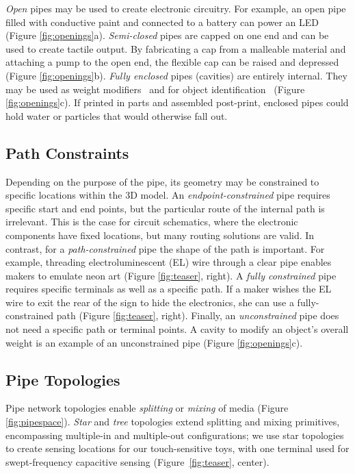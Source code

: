 \emph{Open} pipes may be used to create electronic circuitry.  For example, an open pipe filled with conductive paint and connected to a battery can power an LED (Figure \ref{fig:openings}a).
%
\emph{Semi-closed} pipes are capped on one end and can be used to create tactile output. By fabricating a cap from a malleable material and attaching a pump to the open end, the flexible cap can be raised and depressed (Figure \ref{fig:openings}b).
%
\emph{Fully enclosed} pipes (cavities) are entirely internal.  They may be used as weight modifiers~\cite{Prevost-makeitstand} and for object identification~\cite{Willis-infrastructs} (Figure \ref{fig:openings}c).  If printed in parts and assembled post-print, enclosed pipes could hold water or particles that would otherwise fall out.

\subsection{Path Constraints}
Depending on the purpose of the pipe, its geometry may be constrained to specific locations within the 3D model. An \emph{endpoint-constrained} pipe requires specific start and end points, but the particular route of the internal path is irrelevant. This is the case for circuit schematics, where the electronic components have fixed locations, but many routing solutions are valid. In contrast, for a \emph{path-constrained} pipe the shape of the path is important. For example, threading electroluminescent (EL) wire through a clear pipe enables makers to emulate neon art (Figure \ref{fig:teaser}, right). A \emph{fully constrained} pipe requires specific terminals as well as a specific path. If a maker wishes the EL wire to exit the rear of the sign to hide the electronics, she can use a fully-constrained path (Figure \ref{fig:teaser}, right). Finally, an \emph{unconstrained} pipe does not need a specific path or terminal points. A cavity to modify an object's overall weight is an example of an unconstrained pipe (Figure \ref{fig:openings}c).

\subsection{Pipe Topologies}
Pipe network topologies enable \emph{splitting} or \emph{mixing} of media (Figure \ref{fig:pipespace}).  \emph{Star} and \emph{tree} topologies extend splitting and mixing primitives, encompassing multiple-in and multiple-out configurations; we use star topologies to create sensing locations for our touch-sensitive toys, with one terminal used for swept-frequency capacitive sensing (Figure~\ref{fig:teaser}, center).

